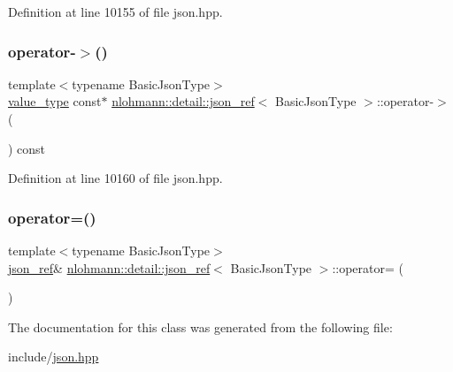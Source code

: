 Definition at line 10155 of file json.\+hpp.

\mbox{\label{classnlohmann_1_1detail_1_1json__ref_adb652774a67829876449dc0b30637456}} 
\subsubsection{\texorpdfstring{operator-\/$>$()}{operator->()}}
{\footnotesize\ttfamily template$<$typename Basic\+Json\+Type$>$ \\
\hyperlink{classnlohmann_1_1detail_1_1json__ref_a78d76cf288141049568c0d670ed670ef}{value\+\_\+type} const$\ast$ \hyperlink{classnlohmann_1_1detail_1_1json__ref}{nlohmann\+::detail\+::json\+\_\+ref}$<$ Basic\+Json\+Type $>$\+::operator-\/$>$ (\begin{DoxyParamCaption}{ }\end{DoxyParamCaption}) const\hspace{0.3cm}{\ttfamily [inline]}}



Definition at line 10160 of file json.\+hpp.

\mbox{\label{classnlohmann_1_1detail_1_1json__ref_a98956ba676b1ae16b62346f9c4fb752e}} 
\subsubsection{\texorpdfstring{operator=()}{operator=()}}
{\footnotesize\ttfamily template$<$typename Basic\+Json\+Type$>$ \\
\hyperlink{classnlohmann_1_1detail_1_1json__ref}{json\+\_\+ref}\& \hyperlink{classnlohmann_1_1detail_1_1json__ref}{nlohmann\+::detail\+::json\+\_\+ref}$<$ Basic\+Json\+Type $>$\+::operator= (\begin{DoxyParamCaption}\item[{const \hyperlink{classnlohmann_1_1detail_1_1json__ref}{json\+\_\+ref}$<$ Basic\+Json\+Type $>$ \&}]{ }\end{DoxyParamCaption})\hspace{0.3cm}{\ttfamily [delete]}}



The documentation for this class was generated from the following file\+:\begin{DoxyCompactItemize}
\item 
include/\hyperlink{json_8hpp}{json.\+hpp}\end{DoxyCompactItemize}

